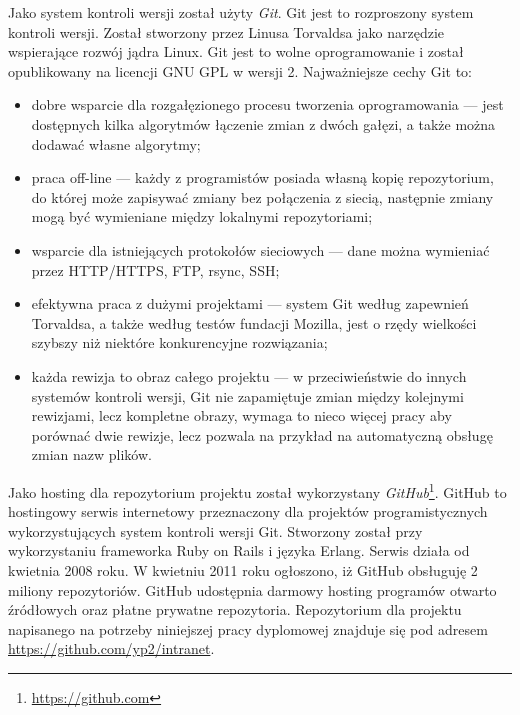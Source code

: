 Jako system kontroli wersji został użyty \emph{Git}. Git jest to rozproszony system kontroli wersji. Został stworzony przez Linusa Torvaldsa jako narzędzie wspierające rozwój jądra Linux. Git jest to wolne oprogramowanie i został opublikowany na licencji GNU GPL w wersji 2. Najważniejsze cechy Git to: 
\begin{itemize}
 \item dobre wsparcie dla rozgałęzionego procesu tworzenia oprogramowania --- jest dostępnych kilka algorytmów łączenie zmian z dwóch gałęzi, a także można dodawać własne algorytmy;
 \item praca off-line --- każdy z programistów posiada własną kopię repozytorium, do której może zapisywać zmiany bez połączenia z siecią, następnie zmiany mogą być wymieniane między lokalnymi repozytoriami;
 \item wsparcie dla istniejących protokołów sieciowych --- dane można wymieniać przez HTTP/HTTPS, FTP, rsync, SSH;
 \item efektywna praca z dużymi projektami --- system Git według zapewnień Torvaldsa, a także według testów fundacji Mozilla, jest o rzędy wielkości szybszy niż niektóre konkurencyjne rozwiązania;
 \item każda rewizja to obraz całego projektu --- w przeciwieństwie do innych systemów kontroli wersji, Git nie zapamiętuje zmian między kolejnymi rewizjami, lecz kompletne obrazy, wymaga to nieco więcej pracy aby porównać dwie rewizje, lecz pozwala na przykład na automatyczną obsługę zmian nazw plików.
\end{itemize}

Jako hosting dla repozytorium projektu został wykorzystany \emph{GitHub}\footnote{\url{https://github.com}}. GitHub to hostingowy serwis internetowy przeznaczony dla projektów programistycznych wykorzystujących system kontroli wersji Git. Stworzony został przy wykorzystaniu frameworka Ruby on Rails i języka Erlang. Serwis działa od kwietnia 2008 roku. W kwietniu 2011 roku ogłoszono, iż GitHub obsługuję 2 miliony repozytoriów. GitHub udostępnia darmowy hosting programów otwarto źródłowych oraz płatne prywatne repozytoria.
Repozytorium dla projektu napisanego na potrzeby niniejszej pracy dyplomowej znajduje się pod adresem \url{https://github.com/yp2/intranet}.
